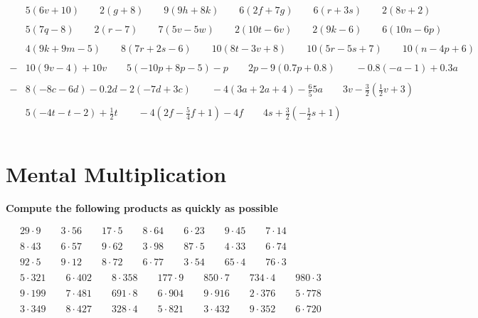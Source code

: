 \documentclass{article}
\begin{document}
\bigskip

\(\begin{aligned}
	&5(6v+10) \qquad 2(g+8) \qquad 9(9h+8k) \qquad 6(2f+7g) \qquad 6(r+3s) \qquad 2(8v+2) \\\\
	&5(7q-8)  \qquad 2(r-7) \qquad 7(5v-5w) \qquad 2(10t-6v)\qquad 2(9k-6) \qquad 6(10n-6p)  \\\\
	&4(9k+9m-5) \qquad 8(7r+2s-6) \qquad 10(8t-3v+8) \qquad 10(5r-5s+7) \qquad 10(n-4p+6) \\\\
	-&10(9v-4)+10v \qquad 5(-10p+8p-5)-p \qquad 2p-9(0.7p+0.8) \qquad -0.8(-a-1)+0.3a\\\\
	-&8(-8c-6d)-0.2d-2(-7d+3c) \qquad-4(3a+2a+4)-\frac{6}{5}5a \qquad 3v-\frac{3}{2}(\frac{1}{2}v+3)\\\\
	&5(-4t-t-2)+\frac{1}{2}t \qquad-4(2f-\frac{5}{4}f+1)-4f \qquad 4s+\frac{3}{2}(-\frac{1}{2}s+1)\\\\
\end{aligned}\)

\bigskip

\section{Mental Multiplication}
\textbf{Compute the following products as quickly as possible}

\bigskip


\(\begin{aligned}
	&29\cdot9 \qquad 3\cdot56 \qquad 17\cdot5 \qquad 8\cdot64 \qquad 6\cdot23 \qquad 9\cdot45 \qquad 7\cdot14 \\\\
	&8\cdot43  \qquad 6\cdot57 \qquad 9\cdot62 \qquad 3\cdot98\qquad 87\cdot5 \qquad 4\cdot33 \qquad 6\cdot74\\\\
	&92\cdot5 \qquad 9\cdot12 \qquad 8\cdot72 \qquad 6\cdot77 \qquad 3\cdot54 \qquad 65\cdot4 \qquad 76\cdot3\\\\
	&5\cdot321 \qquad 6\cdot402 \qquad 8\cdot358 \qquad 177\cdot9 \qquad 850\cdot7 \qquad 734\cdot4 \qquad 980\cdot3 \\\\
	&9\cdot199 \qquad 7\cdot481 \qquad 691\cdot8 \qquad 6\cdot904 \qquad 9\cdot916 \qquad 2\cdot376 \qquad 5\cdot778 \\\\\
	&3\cdot349 \qquad 8\cdot427 \qquad 328\cdot4 \qquad 5\cdot821 \qquad 3\cdot432 \qquad 9\cdot352 \qquad 6\cdot720 \\\\\
\end{aligned}\)
\bigskip
\end{document}
